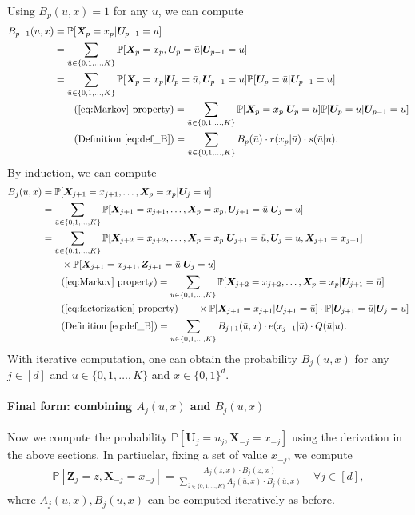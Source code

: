 \documentclass[12pt]{article}
\theoremstyle{definition}
\def\P{\mathbb{P}}
\def\P{\mathbb{P}}
\renewcommand{\P}{\mathbb{P}}							%
\newcommand{\prx}{\bm X}								%
\newcommand{\prz}{\bm Z}								%
\newcommand{\pru}{{\bm U}}								%
\begin{document}
Using $B_p(u,x)=1$ for any $u$, we can compute 
\begin{align*}
	B_{p-1}(u,x)
	&
	=\P[\prx_{p}=x_p|\pru_{p-1}=u]\\
	&
	=\sum_{\bar u\in\{0,1,\ldots,K\}}\P[\prx_p=x_p,\pru_{p}=\bar u|\pru_{p-1}=u]\\
	&
	=\sum_{\bar u\in\{0,1,\ldots,K\}} \P[\prx_p=x_p|\pru_p=\bar u,\pru_{p-1}=u]\P[\pru_p=\bar u|\pru_{p-1}=u]\\
	&\tag{\ref{eq:Markov} property}
	=\sum_{\bar u\in\{0,1,\ldots,K\}} \P[\prx_p=x_p|\pru_p=\bar u]\P[\pru_p=\bar u|\pru_{p-1}=u]\\
	&\tag{Definition \eqref{eq:def_B}}
	=\sum_{\bar u\in\{0,1,\ldots,K\}} B_{p}(\bar u)\cdot r(x_p|\bar u)\cdot s(\bar u|u).
\end{align*}
By induction, we can compute 
\begin{align*}
	B_{j}(u,x)
	&
	=\P[\bm X_{j+1}=x_{j+1},\ldots, \prx_{p}=x_{p}|\pru_{j}=u]\\
	&
	=\sum_{\bar u\in\{0,1,\ldots,K\}}\P[\bm X_{j+1}=x_{j+1},\ldots, \prx_{p}=x_{p},\pru_{j+1}=\bar u|\pru_{j}=u]\\
	&
	=\sum_{\bar u\in\{0,1,\ldots,K\}}\P[\prx_{j+2}=x_{j+2},\ldots, \prx_{p}=x_{p}|\pru_{j+1}=\bar u,\pru_{j}=u,\prx_{j+1}=x_{j+1}]\\
	&
	\qquad\times\P[\prx_{j+1}=x_{j+1},\prz_{j+1}=\bar u|\pru_{j}=u]\\
	&\tag{\ref{eq:Markov} property}
	=\sum_{\bar u\in\{0,1,\ldots,K\}}\P[\prx_{j+2}=x_{j+2},\ldots, \prx_{p}=x_{p}|\pru_{j+1}=\bar u]\\
	&\tag{\ref{eq:factorization} property}
	\qquad\times \P[\prx_{j+1}=x_{j+1}|\pru_{j+1}=\bar u]\cdot \P[\pru_{j+1}=\bar u|\pru_{j}=u]\\
	&\tag{Definition \eqref{eq:def_B}}
	=\sum_{\bar u\in\{0,1,\ldots,K\}}B_{j+1}(\bar u,x)\cdot e(x_{j+1}|\bar u)\cdot Q(\bar u|u).
\end{align*}
With iterative computation, one can obtain the probability $B_j(u,x)$ for any $j\in[d]$ and $u\in \{0,1,\ldots,K\}$ and $x\in\{0,1\}^d$.

\paragraph{Final form: combining $A_j(u,x)$ and $B_j(u,x)$}

Now we compute the probability $\P[\pru_j=u_j,\prx_{-j}=x_{-j}]$ using the derivation in the above sections. In partiuclar, fixing a set of value $x_{-j}$, we compute 
\begin{align*}
	\P[\prz_j=z,\prx_{-j}=x_{-j}]=\frac{A_j(z,x)\cdot B_j(z,x)}{\sum_{\bar z\in \{0,1,\ldots,K\}}A_j(\bar u,x)\cdot B_j(\bar u,x)}\quad\forall j\in[d],
\end{align*}
where $A_j(u,x),B_j(u,x)$ can be computed iteratively as before.
\end{document}
